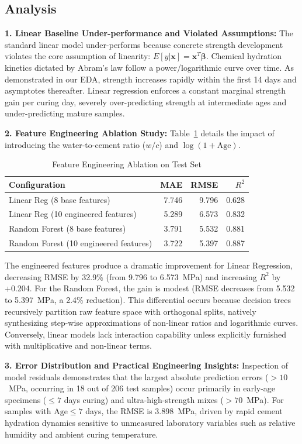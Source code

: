 \documentclass[conference]{IEEEtran}
\begin{document}
\subsection{Analysis}
\textbf{1. Linear Baseline Under-performance and Violated Assumptions:}
The standard linear model under-performs because concrete strength development violates the core assumption of linearity: $E[y|\mathbf{x}] = \mathbf{x}^T \boldsymbol{\beta}$. Chemical hydration kinetics dictated by Abram's law follow a power/logarithmic curve over time. As demonstrated in our EDA, strength increases rapidly within the first 14 days and asymptotes thereafter. Linear regression enforces a constant marginal strength gain per curing day, severely over-predicting strength at intermediate ages and under-predicting mature samples.

\textbf{2. Feature Engineering Ablation Study:}
Table~\ref{tab:ablation} details the impact of introducing the water-to-cement ratio ($w/c$) and $\log(1+\text{Age})$.

\begin{table}[htbp]
\caption{Feature Engineering Ablation on Test Set}
\label{tab:ablation}
\centering
\small
\begin{tabular}{lrrr}
\toprule
\textbf{Configuration} & \textbf{MAE} & \textbf{RMSE} & \textbf{$R^2$} \\
\midrule
Linear Reg (8 base features) & 7.746 & 9.796 & 0.628 \\
Linear Reg (10 engineered features) & 5.289 & 6.573 & 0.832 \\
Random Forest (8 base features) & 3.791 & 5.532 & 0.881 \\
Random Forest (10 engineered features) & 3.722 & 5.397 & 0.887 \\
\bottomrule
\end{tabular}
\end{table}

The engineered features produce a dramatic improvement for Linear Regression, decreasing RMSE by 32.9\% (from 9.796 to 6.573~MPa) and increasing $R^2$ by +0.204. For the Random Forest, the gain is modest (RMSE decreases from 5.532 to 5.397~MPa, a 2.4\% reduction). This differential occurs because decision trees recursively partition raw feature space with orthogonal splits, natively synthesizing step-wise approximations of non-linear ratios and logarithmic curves. Conversely, linear models lack interaction capability unless explicitly furnished with multiplicative and non-linear terms.

\textbf{3. Error Distribution and Practical Engineering Insights:}
Inspection of model residuals demonstrates that the largest absolute prediction errors ($>10$~MPa, occurring in 18 out of 206 test samples) occur primarily in early-age specimens ($\le 7$ days curing) and ultra-high-strength mixes ($>70$~MPa). For samples with $\text{Age} \le 7$ days, the RMSE is 3.898~MPa, driven by rapid cement hydration dynamics sensitive to unmeasured laboratory variables such as relative humidity and ambient curing temperature.
\end{document}
